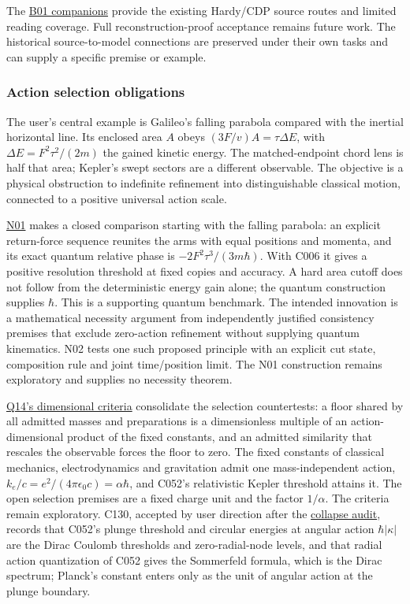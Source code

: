 \documentclass[11pt,a4paper]{article}
\begin{document}
The \href{../references/batches/B01.md}{B01 companions} provide the
existing Hardy/CDP source routes and limited reading coverage. Full
reconstruction-proof acceptance remains future work. The historical
source-to-model connections are preserved under their own tasks and can
supply a specific premise or example.

\hypertarget{action-selection-obligations}{%
\subsubsection{Action selection
obligations}\label{action-selection-obligations}}

The user's central example is Galileo's falling parabola compared with
the inertial horizontal line. Its enclosed area \(A\) obeys
\((3F/v)A=\tau\Delta E\), with \(\Delta E=F^2\tau^2/(2m)\) the gained
kinetic energy. The matched-endpoint chord lens is half that area;
Kepler's swept sectors are a different observable. The objective is a
physical obstruction to indefinite refinement into distinguishable
classical motion, connected to a positive universal action scale.

\href{../notes/newton-insertion-action.md}{N01} makes a closed
comparison starting with the falling parabola: an explicit return-force
sequence reunites the arms with equal positions and momenta, and its
exact quantum relative phase is \(-2F^2\tau^3/(3m\hbar)\). With C006 it
gives a positive resolution threshold at fixed copies and accuracy. A
hard area cutoff does not follow from the deterministic energy gain
alone; the quantum construction supplies \(\hbar\). This is a supporting
quantum benchmark. The intended innovation is a mathematical necessity
argument from independently justified consistency premises that exclude
zero-action refinement without supplying quantum kinematics. N02 tests
one such proposed principle with an explicit cut state, composition rule
and joint time/position limit. The N01 construction remains exploratory
and supplies no necessity theorem.

\href{../notes/action-unit-dimensional-selection.md}{Q14's dimensional
criteria} consolidate the selection countertests: a floor shared by all
admitted masses and preparations is a dimensionless multiple of an
action-dimensional product of the fixed constants, and an admitted
similarity that rescales the observable forces the floor to zero. The
fixed constants of classical mechanics, electrodynamics and gravitation
admit one mass-independent action,
\(k_e/c=e^2/(4\pi\epsilon_0c)=\alpha\hbar\), and C052's relativistic
Kepler threshold attains it. The open selection premises are a fixed
charge unit and the factor \(1/\alpha\). The criteria remain
exploratory. C130, accepted by user direction after the
\href{../reviews/kepler-collapse-Q14.md}{collapse audit}, records that
C052's plunge threshold and circular energies at angular action
\(\hbar|\kappa|\) are the Dirac Coulomb thresholds and zero-radial-node
levels, and that radial action quantization of C052 gives the Sommerfeld
formula, which is the Dirac spectrum; Planck's constant enters only as
the unit of angular action at the plunge boundary.
\end{document}
